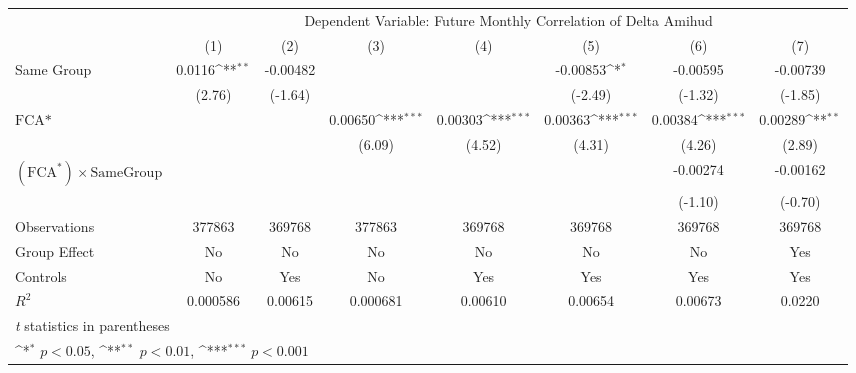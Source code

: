 {
\def\sym#1{\ifmmode^{#1}\else\(^{#1}\)\fi}
\begin{tabular}{l*{7}{c}}
\hline\hline
                &\multicolumn{7}{c}{Dependent Variable: Future Monthly Correlation of Delta Amihud}                                                  \\\cmidrule(lr){2-8}
                &\multicolumn{1}{c}{(1)}         &\multicolumn{1}{c}{(2)}         &\multicolumn{1}{c}{(3)}         &\multicolumn{1}{c}{(4)}         &\multicolumn{1}{c}{(5)}         &\multicolumn{1}{c}{(6)}         &\multicolumn{1}{c}{(7)}         \\
\hline
Same Group      &   0.0116\sym{**} & -0.00482         &                  &                  & -0.00853\sym{*}  & -0.00595         & -0.00739         \\
                &   (2.76)         &  (-1.64)         &                  &                  &  (-2.49)         &  (-1.32)         &  (-1.85)         \\
[1em]
$ \text{FCA*} $ &                  &                  &  0.00650\sym{***}&  0.00303\sym{***}&  0.00363\sym{***}&  0.00384\sym{***}&  0.00289\sym{**} \\
                &                  &                  &   (6.09)         &   (4.52)         &   (4.31)         &   (4.26)         &   (2.89)         \\
[1em]
 $ (\text{FCA}^*) \times {\text{SameGroup} }  $ &                  &                  &                  &                  &                  & -0.00274         & -0.00162         \\
                &                  &                  &                  &                  &                  &  (-1.10)         &  (-0.70)         \\
\hline
Observations    &   377863         &   369768         &   377863         &   369768         &   369768         &   369768         &   369768         \\
Group Effect    &       No         &       No         &       No         &       No         &       No         &       No         &      Yes         \\
Controls        &       No         &      Yes         &       No         &      Yes         &      Yes         &      Yes         &      Yes         \\
$ R^2 $         & 0.000586         &  0.00615         & 0.000681         &  0.00610         &  0.00654         &  0.00673         &   0.0220         \\
\hline\hline
\multicolumn{8}{l}{\footnotesize \textit{t} statistics in parentheses}\\
\multicolumn{8}{l}{\footnotesize \sym{*} \(p<0.05\), \sym{**} \(p<0.01\), \sym{***} \(p<0.001\)}\\
\end{tabular}
}
